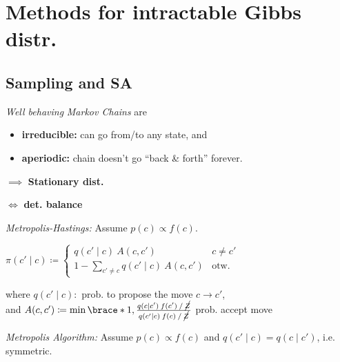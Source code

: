 \section{Methods for intractable Gibbs distr.}


\subsection{Sampling and SA}

\textit{Well behaving} \emph{Markov Chains} are
\begin{itemize}
    \item \textbf{irreducible:} can go from/to any state, and
    \item \textbf{aperiodic:} chain doesn't go ``back \& forth'' forever.
\end{itemize}

$\implies$ \textbf{Stationary dist.} 

$\iff$ \textbf{det. balance} 

\emph{Metropolis-Hastings:}
Assume $p(c) \propto f(c)$.

$\pi(c'\mid c) \coloneqq
\begin{cases}
    q(c'\mid c) \: A(c,c') & c\neq c'\\
    1 - \sum_{c'\neq c} q(c'\mid c) \: A(c,c') & \text{otw.}
\end{cases}$

where\enskip
$q(c'\mid c) :$ prob. to propose the move $c \to c'$,\\
and\enskip
$A(c,c') \coloneqq \min\brace*{ 1, \frac{q(c\mid c') \: f(c') \: / \: \cancel{Z}}{q(c'\mid c) \: f(c) \: / \: \cancel{Z}} }$ prob. accept move

\columnbreak

\emph{Metropolis Algorithm:}\enspace
Assume $p(c) \propto f(c)$ and $q(c'\mid c) = q(c\mid c')$, i.e. symmetric.


